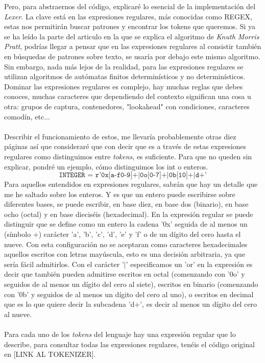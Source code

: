 Pero, para abstraernos del código, explicaré lo esencial de la implementación del \textit{Lexer}. La clave está en las expresiones regulares, más conocidas como REGEX, estas nos permitirán buscar patrones y encontrar los tokens que queremos. Si ya se ha leído la parte del articulo en la que se explica el algoritmo de \textit{Knuth Morris Pratt}, podrías llegar a pensar que en las expresiones regulares al consistir también en búsquedas de patrones sobre texto, se usaría por debajo este mismo algoritmo. Sin embargo, nada más lejos de la realidad, para las expresiones regulares se utilizan algoritmos de autómatas finitos determinísticos y no determinísticos. Dominar las expresiones regulares es complejo, hay muchas reglas que debes conoces, muchas caracteres que dependiendo del contexto significan una cosa u otra: grupos de captura, contenedores, "lookahead" con condiciones, caracteres comodín, etc... \\\\
Describir el funcionamiento de estos, me llevaría probablemente otras diez páginas así que consideraré que con decir que es a través de estas expresiones regulares como distinguimos entre \textit{tokens}, es suficiente. Para que no queden sin explicar, pondré un ejemplo, cómo distinguimos los int o enteros.
\[
\texttt{INTEGER = r'0x[a-f0-9]+|0o[0-7]+|0b[10]+|d+'}
\]
\noindent Para aquellos entendidos en expresiones regulares, sabrán que hay un detalle que me he saltado sobre los enteros. Y es que un entero puede escribirse sobre diferentes bases, se puede escribir, en base diez, en base dos (binario), en base ocho (octal) y en base dieciséis (hexadecimal). En la expresión regular se puede distinguir que se define como un entero la cadena '0x' seguida de al menos un (símbolo +) carácter 'a', 'b', 'c', 'd', 'e' y 'f' o de un dígito del cero hasta el nueve. Con esta configuración no se aceptaran como caracteres hexadecimales aquellos escritos con letras mayúscula, esto es una decisión arbitraria, ya que sería fácil admitirlos. Con el carácter '$|$' especificamos un 'or' en la expresión es decir que también pueden admitirse escritos en octal (comenzando con '0o' y seguidos de al menos un dígito del cero al siete), escritos en binario (comenzando con '0b' y seguidos de al menos un dígito del cero al uno), o escritos en decimal que es lo que quiere decir la subcadena 'd+', es decir al menos un dígito del cero al nueve. \\\\
Para cada uno de los \textit{tokens} del lenguaje hay una expresión regular que lo describe, para consultar todas las expresiones regulares, tenéis el código original en [LINK AL TOKENIZER].




